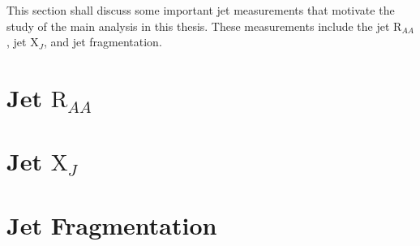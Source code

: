 
This section shall discuss some important jet measurements that motivate the study of the main analysis in this thesis. These measurements include the jet $\mathrm{R}_{AA}$, jet $\mathrm{X}_{J}$, and jet fragmentation. 

\section{Jet $\mathrm{R}_{AA}$}


\section{Jet $\mathrm{X}_{J}$}


\section{Jet Fragmentation}

